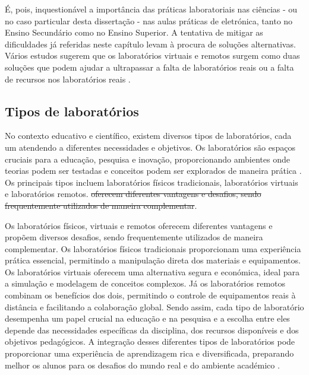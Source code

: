 É, pois, inquestionável a importância das práticas laboratoriais nas ciências - ou no caso particular desta dissertação - nas aulas práticas de eletrónica, tanto no Ensino Secundário como no Ensino Superior. A tentativa de mitigar as dificuldades já referidas neste capítulo levam à procura de soluções alternativas. Vários estudos sugerem que os laboratórios virtuais e remotos surgem como duas soluções que podem ajudar a ultrapassar a falta de laboratórios reais ou a falta de recursos nos laboratórios reais \cite{ImpactRemoteLabTeachingPractices} \cite{developremotelabs} \cite{HERADIO20161} \cite{POTKONJAK2016309}.


\subsection{Tipos de laboratórios} %
\label{sec:tiposlaboratorios}
No contexto educativo e científico, existem diversos tipos de laboratórios, cada um atendendo a diferentes necessidades e objetivos. Os laboratórios são espaços cruciais para a educação, pesquisa e inovação, proporcionando ambientes onde teorias podem ser testadas e conceitos podem ser explorados de maneira prática \cite{Hofsteinfoundations}. Os principais tipos incluem laboratórios físicos tradicionais, laboratórios virtuais e laboratórios remotos. \sout {oferecem diferentes vantagens e desafios, sendo frequentemente utilizados de maneira complementar}.

Os laboratórios físicos, virtuais e remotos oferecem diferentes vantagens e propõem diversos desafios, sendo frequentemente utilizados de maneira complementar. Os laboratórios físicos tradicionais proporcionam uma experiência prática essencial, permitindo a manipulação direta dos materiais e equipamentos. Os laboratórios virtuais oferecem uma alternativa segura e económica, ideal para a simulação e modelagem de conceitos complexos. Já os laboratórios remotos combinam os benefícios dos dois, permitindo o controle de equipamentos reais à distância e facilitando a colaboração global. Sendo assim, cada tipo de laboratório desempenha um papel crucial na educação e na pesquisa e a escolha entre eles depende das necessidades específicas da disciplina, dos recursos disponíveis e dos objetivos pedagógicos. A integração desses diferentes tipos de laboratórios pode proporcionar uma experiência de aprendizagem rica e diversificada, preparando melhor os alunos para os desafios do mundo real e do ambiente académico \cite{BRINSON2015218} \cite{ImpactRemoteLabTeachingPractices} \cite{Hofsteinfoundations}.


